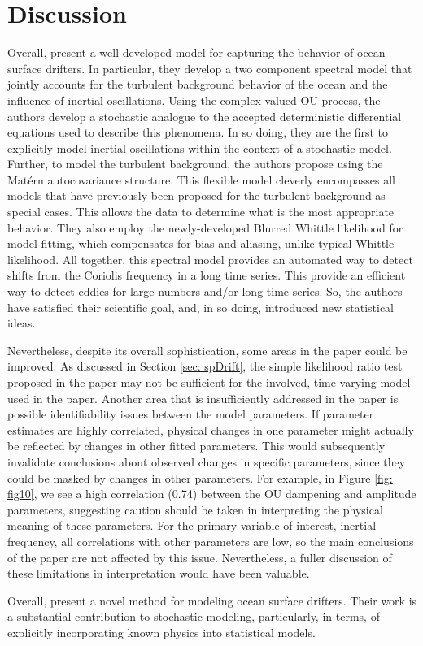 \documentclass{stat572Style}
\begin{document}
\section{Discussion}
\par Overall, \citet{Sykulski2016} present a  well-developed model for capturing the behavior of ocean surface drifters.
 In particular, they develop a two component spectral model that jointly accounts for the turbulent background behavior of the ocean and the influence of inertial oscillations. 
 Using the complex-valued OU process, the authors develop a stochastic analogue to the accepted deterministic differential equations used to describe this phenomena. 
 In so doing, they are the first to explicitly model inertial oscillations within the context of a stochastic model. 
 Further, to model the turbulent background, the authors propose using the  Mat\'{e}rn autocovariance structure.
  This flexible model cleverly encompasses all models that have previously been proposed for the turbulent background as special cases.
  This allows the data to determine what is the most appropriate behavior. 
   They also employ the newly-developed Blurred Whittle likelihood for model fitting, which compensates for bias and aliasing, unlike typical Whittle likelihood. 
   All together, this spectral model provides an automated way to detect shifts from the Coriolis frequency in a long time series. 
This provide an efficient way to detect eddies for large numbers and/or long time series. 
So, the authors have  satisfied their scientific goal, and, in so doing, introduced new statistical ideas.

Nevertheless, despite its overall sophistication, some areas in the paper could be improved. 
As discussed in Section \ref{sec: spDrift}, the simple likelihood ratio test proposed in the paper may not be sufficient for the involved, time-varying model used in the paper.  
Another area that is insufficiently addressed in the paper is possible identifiability issues between the model parameters. 
 If parameter estimates are highly correlated, physical changes in one parameter might actually be reflected by changes in other fitted parameters.
  This would subsequently invalidate conclusions about observed changes in specific parameters, since they could be masked by changes in other parameters. 
 For example, in Figure \ref{fig: fig10}, we see a high correlation (0.74) between the OU dampening and amplitude parameters, suggesting caution should be taken in interpreting the physical meaning of these parameters.
 For the primary variable of interest, inertial frequency, all correlations with other parameters are low, so the main conclusions of the paper are not affected by this issue. 
Nevertheless, a fuller discussion of these limitations in interpretation would have been valuable.
\par Overall, \citet{Sykulski2016} present a novel method for modeling ocean surface drifters.
 Their work is a substantial contribution to stochastic modeling, particularly, in terms, of explicitly incorporating known physics into statistical models. 
\end{document}
